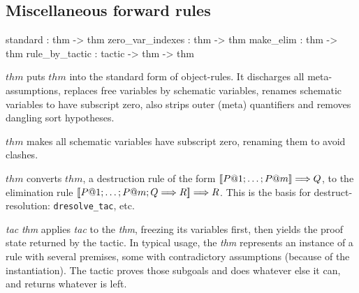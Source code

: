 \subsection{Miscellaneous forward rules}\label{MiscellaneousForwardRules}
\begin{ttbox} 
standard         :           thm -> thm
zero_var_indexes :           thm -> thm
make_elim        :           thm -> thm
rule_by_tactic   : tactic -> thm -> thm
\end{ttbox}
\begin{ttdescription}
\item[\ttindexbold{standard} $thm$] puts $thm$ into the standard form
  of object-rules.  It discharges all meta-assumptions, replaces free
  variables by schematic variables, renames schematic variables to
  have subscript zero, also strips outer (meta) quantifiers and
  removes dangling sort hypotheses.

\item[\ttindexbold{zero_var_indexes} $thm$] 
makes all schematic variables have subscript zero, renaming them to avoid
clashes. 

\item[\ttindexbold{make_elim} $thm$] 
converts $thm$, a destruction rule of the form $\mathopen{[\![} P@1;\ldots;P@m\mathclose{]\!]}\Longrightarrow
Q$, to the elimination rule $\mathopen{[\![} P@1; \ldots; P@m; Q\Longrightarrow R\mathclose{]\!]}\Longrightarrow R$.  This
is the basis for destruct-resolution: {\tt dresolve_tac}, etc.

\item[\ttindexbold{rule_by_tactic} {\it tac} {\it thm}] 
  applies {\it tac\/} to the {\it thm}, freezing its variables first, then
  yields the proof state returned by the tactic.  In typical usage, the
  {\it thm\/} represents an instance of a rule with several premises, some
  with contradictory assumptions (because of the instantiation).  The
  tactic proves those subgoals and does whatever else it can, and returns
  whatever is left.
\end{ttdescription}


